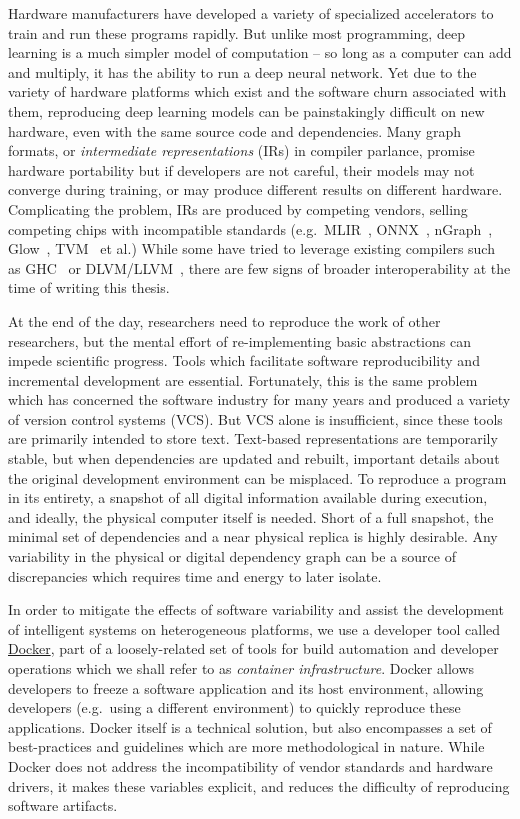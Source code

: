 \documentclass[12pt,initial,twoside,maitrise]{dms}
\numberwithin{equation}{section}
\numberwithin{table}{chapter}
\numberwithin{figure}{chapter}
\begin{document}
Hardware manufacturers have developed a variety of specialized accelerators to train and run these programs rapidly. But unlike most programming, deep learning is a much simpler model of computation -- so long as a computer can add and multiply, it has the ability to run a deep neural network. Yet due to the variety of hardware platforms which exist and the software churn associated with them, reproducing deep learning models can be painstakingly difficult on new hardware, even with the same source code and dependencies. Many graph formats, or \textit{intermediate representations} (IRs) in compiler parlance, promise hardware portability but if developers are not careful, their models may not converge during training, or may produce different results on different hardware. Complicating the problem, IRs are produced by competing vendors, selling competing chips with incompatible standards (e.g.~MLIR~\citep{mlir}, ONNX~\citep{bai2019}, nGraph~\citep{cyphers2018intel}, Glow~\citep{rotem2018glow}, TVM~\citep{tvm2018} et al.) While some have tried to leverage existing compilers such as GHC~\citep{elliott2018simple} or DLVM/LLVM~\citep{wei2017dlvm}, there are few signs of broader interoperability at the time of writing this thesis.

At the end of the day, researchers need to reproduce the work of other researchers, but the mental effort of re-implementing basic abstractions can impede scientific progress. Tools which facilitate software reproducibility and incremental development are essential. Fortunately, this is the same problem which has concerned the software industry for many years and produced a variety of version control systems (VCS). But VCS alone is insufficient, since these tools are primarily intended to store text. Text-based representations are temporarily stable, but when dependencies are updated and rebuilt, important details about the original development environment can be misplaced. To reproduce a program in its entirety, a snapshot of all digital information available during execution, and ideally, the physical computer itself is needed. Short of a full snapshot, the minimal set of dependencies and a near physical replica is highly desirable. Any variability in the physical or digital dependency graph can be a source of discrepancies which requires time and energy to later isolate.

In order to mitigate the effects of software variability and assist the development of intelligent systems on heterogeneous platforms, we use a developer tool called \href{https://www.docker.com}{Docker}, part of a loosely-related set of tools for build automation and developer operations which we shall refer to as \textit{container infrastructure}. Docker allows developers to freeze a software application and its host environment, allowing developers (e.g.~using a different environment) to quickly reproduce these applications. Docker itself is a technical solution, but also encompasses a set of best-practices and guidelines which are more methodological in nature. While Docker does not address the incompatibility of vendor standards and hardware drivers, it makes these variables explicit, and reduces the difficulty of reproducing software artifacts.
\end{document}
